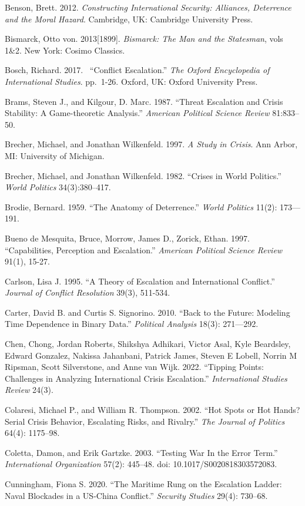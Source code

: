 \documentclass[
]{article}
\begin{document}
Benson, Brett. 2012. \emph{Constructing International Security:
Alliances, Deterrence and the Moral Hazard}. Cambridge, UK: Cambridge
University Press.

Bismarck, Otto von. 2013{[}1899{]}. \emph{Bismarck: The Man and the
Statesman}, vols 1\&2. New York: Cosimo Classics.

Bosch, Richard. 2017.~ ``Conflict Escalation.'' \emph{The Oxford
Encyclopedia of International Studies}. pp.~1-26. Oxford, UK: Oxford
University Press.

Brams, Steven J., and Kilgour, D. Marc. 1987. ``Threat Escalation and
Crisis Stability: A Game-theoretic Analysis.'' \emph{American Political
Science Review} 81:833--50.

Brecher, Michael, and Jonathan Wilkenfeld. 1997. \emph{A Study in
Crisis}. Ann Arbor, MI: University of Michigan.~

Brecher, Michael, and Jonathan Wilkenfeld. 1982. ``Crises in World
Politics.'' \emph{World Politics} 34(3):380--417.

Brodie, Bernard. 1959. ``The Anatomy of Deterrence.'' \emph{World
Politics} 11(2): 173---191.

Bueno de Mesquita, Bruce, Morrow, James D., Zorick, Ethan. 1997.
``Capabilities, Perception and Escalation.'' \emph{American Political
Science Review} 91(1), 15-27.

Carlson, Lisa J. 1995. ``A Theory of Escalation and International
Conflict.'' \emph{Journal of Conflict Resolution} 39(3), 511-534.

Carter, David B. and Curtis S. Signorino. 2010. ``Back to the Future:
Modeling Time Dependence in Binary Data.'' \emph{Political Analysis}
18(3): 271---292.

Chen, Chong, Jordan Roberts, Shikshya Adhikari, Victor Asal, Kyle
Beardsley, Edward Gonzalez, Nakissa Jahanbani, Patrick James, Steven E
Lobell, Norrin M Ripsman, Scott Silverstone, and Anne van Wijk. 2022.
``Tipping Points: Challenges in Analyzing International Crisis
Escalation.'' \emph{International Studies Review} 24(3).

Colaresi, Michael P., and William R. Thompson. 2002. ``Hot Spots or Hot
Hands? Serial Crisis Behavior, Escalating Risks, and Rivalry.''
\emph{The Journal of Politics} 64(4): 1175--98.

Coletta, Damon, and Erik Gartzke. 2003. ``Testing War In the Error
Term.'' \emph{International Organization} 57(2): 445--48. doi:
10.1017/S0020818303572083.

Cunningham, Fiona S. 2020. ``The Maritime Rung on the Escalation Ladder:
Naval Blockades in a US-China Conflict.'' \emph{Security Studies} 29(4):
730--68.
\end{document}
